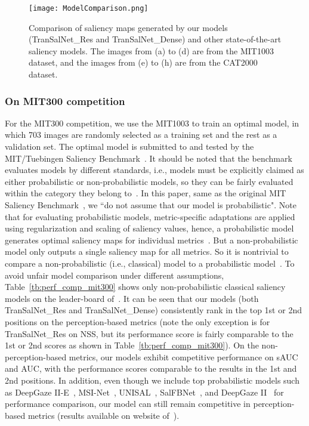 \documentclass{article}
\begin{document}
\begin{figure*}
\centering
\texttt{[image: ModelComparison.png]}
\caption{Comparison of saliency maps generated by our models (TranSalNet\_Res and TranSalNet\_Dense) and other state-of-the-art saliency models. The images from (a) to (d) are from the MIT1003 dataset, and the images from (e) to (h) are from the CAT2000 dataset.}
\label{fig:demo1}
\end{figure*}

\subsubsection{On MIT300 competition}


For the MIT300 competition, we use the MIT1003 to train an optimal model, in which 703 images are randomly selected as a training set and the rest as a validation set. 
The optimal model is submitted to and tested by the MIT/Tuebingen Saliency Benchmark~\cite{benchmark}. It should be noted that the benchmark evaluates models by different standards, i.e., models must be explicitly claimed as either probabilistic or non-probabilistic models, so they can be fairly evaluated within the category they belong to~\cite{Bylinskii_2019}.
In this paper, same as the original MIT Saliency Benchmark~\cite{Bylinskii_2019}, we ``do not assume that our model is probabilistic". Note that for evaluating probabilistic models, metric-specific adaptations are applied using regularization and scaling of saliency values, hence, a probabilistic model generates optimal saliency maps for individual metrics~\cite{kummerer2018}. But a non-probabilistic model only outputs a single saliency map for all metrics. So it is nontrivial to compare a non-probabilistic (i.e., classical) model to a probabilistic model~\cite{Bylinskii_2019}.
To avoid unfair model comparison under different assumptions, Table~\ref{tb:perf_comp_mit300} shows only non-probabilistic classical saliency models on the leader-board of~\cite{benchmark}. 
It can be seen that our models (both TranSalNet\_Res and TranSalNet\_Dense) consistently rank in the top 1st or 2nd positions on the perception-based metrics (note the only exception is for TranSalNet\_Res on NSS, but its performance score is fairly comparable to the 1st or 2nd scores as shown in Table~\ref{tb:perf_comp_mit300}). On the non-perception-based metrics, our models exhibit competitive performance on sAUC and AUC, with the performance scores comparable to the results in the 1st and 2nd positions. 
In addition, even though we include top probabilistic models such as DeepGaze II-E~\cite{DP2E}, MSI-Net~\cite{MSI-Net}, UNISAL~\cite{UNISAL}, SalFBNet~\cite{SalFBNet}, and DeepGaze II~\cite{DeepGaze2} for performance comparison, our model can still remain competitive in perception-based metrics (results available on website of~\cite{benchmark}).
\end{document}
